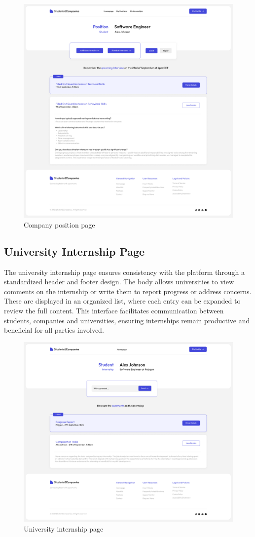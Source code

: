 \begin{figure}
    \centering
    \includegraphics[width=16cm]{images/selected-pages/company-position-page.png}
    \caption{Company position page}
\end{figure}

\subsection{University Internship Page}
The university internship page ensures consistency with the platform through a standardized header and footer design.
The body allows universities to view comments on the internship or write them to report progress or address concerns.
These are displayed in an organized list, where each entry can be expanded to review the full content.
This interface facilitates communication between students, companies and universities, ensuring internships remain productive and beneficial for all parties involved.

\begin{figure}[h]
    \centering
    \includegraphics[width=16cm]{images/selected-pages/university-internship-page.png}
    \caption{University internship page}
\end{figure}

